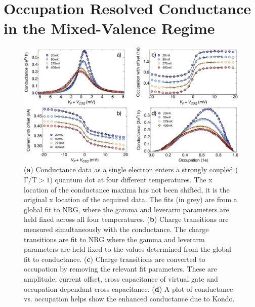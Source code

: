 \chapter{Occupation Resolved Conductance in the Mixed-Valence Regime}\label{cha:mixed_valence_conductance}




\begin{figure}[ht]
  \begin{center}
    \includegraphics[width=1\textwidth]{figures/ch3/crop_PosterFiguresMaster.010.png}
    \caption[Method to determine gamma and leverarm and show Kondo enhancement of conductance in the mixed-valence regime]{\label{fig:ch3/cond_occ_gf} 
    (\textbf{a}) Conductance data as a single electron enters a strongly coupled ($\mathrm{\Gamma/T > 1}$) quantum dot at four different temperatures. The x location of the conductance maxima has not been shifted, it is the original x location of the acquired data. The fits (in grey) are from a global fit to NRG, where the gamma and leverarm parameters are held fixed across all four temperatures. (\textbf{b}) Charge transitions are measured simultaneously with the conductance. The charge transitions are fit to NRG where the gamma and leverarm parameters are held fixed to the values determined from the global fit to conductance. (\textbf{c}) Charge transitions are converted to occupation by removing the relevant fit parameters. These are amplitude, current offset, cross capacitance of virtual gate and occupation dependant cross capacitance. (\textbf{d}) A plot of conductance vs. occupation helps show the enhanced conductance due to Kondo.}
  \end{center}
\end{figure}




